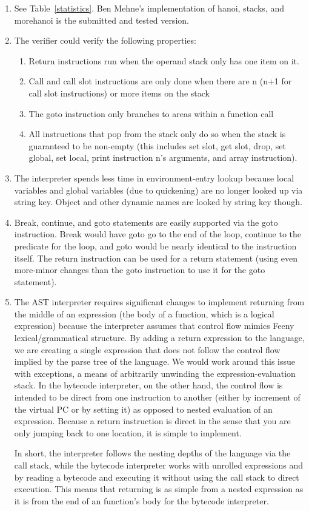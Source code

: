 \documentclass[notitlepage]{report}
\begin{document}
\begin{enumerate}
	\item
			See Table~\ref{statistics}.  Ben Mehne's implementation of hanoi, stacks, and morehanoi is the submitted and tested version.
	\item The verifier could verify the following properties:
		\begin{enumerate}
			\item Return instructions run when the operand stack only has one item on it.
			\item Call and call slot instructions are only done when there are n (n+1 for call slot instructions) or more items on the stack
			\item The goto instruction only branches to areas within a function call
			\item All instructions that pop from the stack only do so when the stack is guaranteed to be non-empty (this includes set slot, get slot, drop, set global, set local, print instruction n's arguments, and array instruction).
		\end{enumerate}

	\item The interpreter spends less time in environment-entry lookup because local variables and global variables (due to quickening) are no longer looked up via string key.  Object and other dynamic names are looked by string key though.
	\item Break, continue, and goto statements are easily supported via the goto instruction.  Break would have goto go to the end of the loop, continue to the predicate for the loop, and goto would be nearly identical to the instruction itself.  The return instruction can be used for a return statement (using even more-minor changes than the goto instruction to use it for the goto statement).
	\item The AST interpreter requires significant changes to implement returning from the middle of an expression (the body of a function, which is a logical expression) because the interpreter assumes that control flow mimics Feeny lexical/grammatical structure.  By adding a return expression to the language, we are creating a single expression that does not follow the control flow implied by the parse tree of the language.  We would work around this issue with exceptions, a means of arbitrarily unwinding the expression-evaluation stack.  In the bytecode interpreter, on the other hand, the control flow is intended to be direct from one instruction to another (either by increment of the virtual PC or by setting it) as opposed to nested evaluation of an expression.  Because a return instruction is direct in the sense that you are only jumping back to one location, it is simple to implement.

		In short, the interpreter follows the nesting depths of the language via the call stack, while the bytecode interpreter works with unrolled expressions and by reading a bytecode and executing it without using the call stack to direct execution.  This means that returning is as simple from a nested expression as it is from the end of an function's body for the bytecode interpreter.
\end{enumerate}
\end{document}
